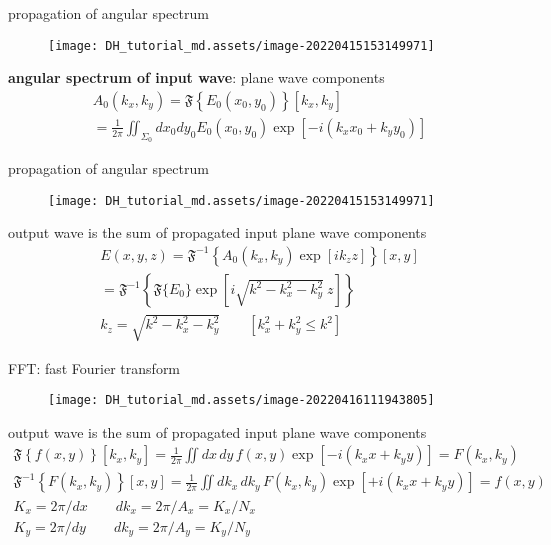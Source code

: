 \documentclass[t, aspectratio=169]{beamer}
\begin{document}
\begin{frame}{propagation of angular spectrum}
	\begin{figure}
		\texttt{[image: DH\_tutorial\_md.assets/image-20220415153149971]}
	\end{figure}

\textbf{angular spectrum of input wave}: plane wave components
	\begin{gather*}
A_0(k_x,k_y) = \mathfrak F\left\{E_0(x_0,y_0)\right\}\left[k_x,k_y\right] \\
=\frac{1}{2\pi}\iint_{\Sigma_0} dx_0 dy_0 E_0(x_0,y_0) \exp\left[-i(k_x x_0 + k_y y_0)\right]
	\end{gather*}

\end{frame}


\begin{frame}{propagation of angular spectrum}
	\begin{figure}
		\texttt{[image: DH\_tutorial\_md.assets/image-20220415153149971]}
	\end{figure}

output wave is the sum of propagated input plane wave components
	\begin{gather*}
E(x,y,z) = \mathfrak F^{-1}\left\{A_0(k_x,k_y) \exp[ik_z z]\right\}[x,y] \\
= \mathfrak F^{-1}\left\{\mathfrak F\{E_0\}\exp\left[i\sqrt{k^2 - k_x^2 - k_y^2}\ z\right]\right\} \\
k_z = \sqrt{k^2 - k_x^2 - k_y^2} \qquad \left[ k_x^2 + k_y^2 \le k^2 \right]	\end{gather*}

\end{frame}


\begin{frame}{FFT: fast Fourier transform}
	\begin{figure}
		\texttt{[image: DH\_tutorial\_md.assets/image-20220416111943805]}
	\end{figure}

output wave is the sum of propagated input plane wave components
	\begin{gather*}
\mathfrak F\left\{f(x,y)\right\}[k_x,k_y] = \frac{1}{2\pi}\iint dx\,dy\,f(x,y)\exp\left[-i(k_x x + k_yy)\right] = F(k_x,k_y) \\
\mathfrak F^{-1}\left\{F(k_x,k_y)\right\}[x,y] = \frac{1}{2\pi}\iint dk_x\,dk_y\,F(k_x,k_y)\exp\left[+i(k_x x + k_yy)\right] = f(x,y) \\
K_x = 2\pi/dx \qquad dk_x = 2\pi/A_x = K_x/N_x \\
K_y = 2\pi/dy \qquad dk_y = 2\pi/A_y = K_y/N_y
	\end{gather*}
\end{frame}
\end{document}
